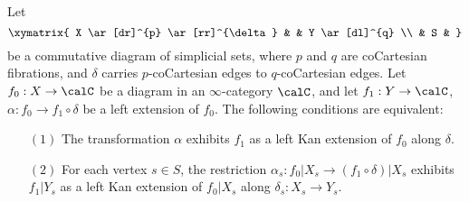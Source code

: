 \begin{proposition}\label{longwait2}\label{Kan extension!in families}
Let
$$ \xymatrix{ X \ar[dr]^{p} \ar[rr]^{\delta} & & Y \ar[dl]^{q} \\
& S & }$$
be a commutative diagram of simplicial sets, where $p$ and $q$ are coCartesian fibrations,
and $\delta$ carries $p$-coCartesian edges to $q$-coCartesian edges.
Let $f_0: X \rightarrow \calC$ be a diagram in an $\infty$-category $\calC$, and let
$f_1: Y \rightarrow \calC$, $\alpha: f_0 \rightarrow f_1 \circ \delta$ be a left extension of 
$f_0$. The following conditions are equivalent:
\begin{itemize}
\item[$(1)$] The transformation $\alpha$ exhibits $f_1$ as a left Kan extension of $f_0$ along
$\delta$.
\item[$(2)$] For each vertex $s \in S$, the restriction $\alpha_{s}: f_0|X_{s} \rightarrow
(f_1 \circ \delta)|X_s$ exhibits $f_1|Y_{s}$ as a left Kan extension of $f_0|X_{s}$ along
$\delta_{s}: X_{s} \rightarrow Y_{s}$.
\end{itemize}
\end{proposition}

